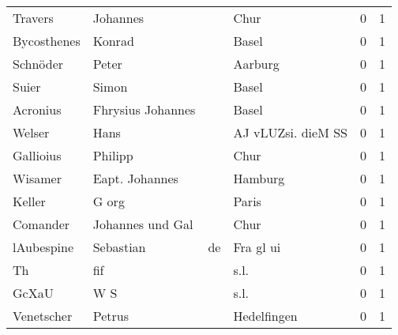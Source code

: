 \begin{tabular}{llllrr}
                  Travers &                           Johannes &             &                                        Chur &          0 &         1 \\
              Bycosthenes &                             Konrad &             &                                       Basel &          0 &         1 \\
                 Schnöder &                              Peter &             &                                     Aarburg &          0 &         1 \\
                    Suier &                              Simon &             &                                       Basel &          0 &         1 \\
                 Acronius &                  Fhrysius Johannes &             &                                       Basel &          0 &         1 \\
                   Welser &                               Hans &             &                          AJ vLUZsi. dieM SS &          0 &         1 \\
                Gallioius &                            Philipp &             &                                        Chur &          0 &         1 \\
                  Wisamer &                     Eapt. Johannes &             &                                     Hamburg &          0 &         1 \\
                   Keller &                              G org &             &                                       Paris &          0 &         1 \\
                 Comander &                   Johannes und Gal &             &                                        Chur &          0 &         1 \\
               lAubespine &                          Sebastian &          de &                                   Fra gl ui &          0 &         1 \\
                       Th &                                fif &             &                                        s.l. &          0 &         1 \\
                    GcXaU &                                W S &             &                                        s.l. &          0 &         1 \\
               Venetscher &                             Petrus &             &                                 Hedelfingen &          0 &         1 \\

\end{tabular}
